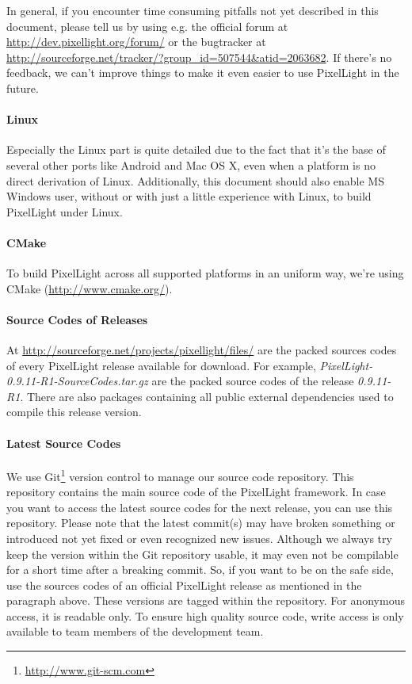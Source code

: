 In general, if you encounter time consuming pitfalls not yet described in this document, please tell us by using e.g. the official forum at \url{http://dev.pixellight.org/forum/} or the bugtracker at \url{http://sourceforge.net/tracker/?group_id=507544&atid=2063682}. If there's no feedback, we can't improve things to make it even easier to use PixelLight in the future.


\paragraph{Linux}
Especially the Linux part is quite detailed due to the fact that it's the base of several other ports like Android and Mac OS X, even when a platform is no direct derivation of Linux. Additionally, this document should also enable \ac{MS} Windows user, without or with just a little experience with Linux, to build PixelLight under Linux.


\paragraph{CMake}
To build PixelLight across all supported platforms in an uniform way, we're using CMake (\url{http://www.cmake.org/}).


\paragraph{Source Codes of Releases}
At \url{http://sourceforge.net/projects/pixellight/files/} are the packed sources codes of every PixelLight release available for download. For example, \emph{PixelLight-0.9.11-R1-SourceCodes.tar.gz} are the packed source codes of the release \emph{0.9.11-R1}. There are also packages containing all public external dependencies used to compile this release version.


\paragraph{Latest Source Codes}
We use Git\footnote{\url{http://www.git-scm.com}} version control to manage our source code repository. This repository contains the main source code of the PixelLight framework. In case you want to access the latest source codes for the next release, you can use this repository. Please note that the latest commit(s) may have broken something or introduced not yet fixed or even recognized new issues. Although we always try keep the version within the Git repository usable, it may even not be compilable for a short time after a breaking commit. So, if you want to be on the safe side, use the sources codes of an official PixelLight release as mentioned in the paragraph above. These versions are tagged within the repository. For anonymous access, it is readable only. To ensure high quality source code, write access is only available to team members of the development team.

